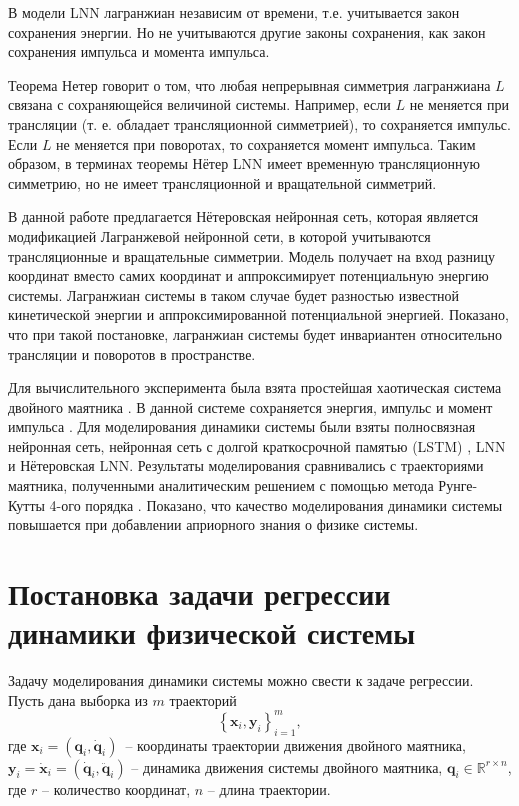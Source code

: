 \documentclass[12pt]{article}
\begin{document}
В модели LNN лагранжиан независим от времени, т.е. учитывается закон сохранения энергии. Но не учитываются другие законы сохранения, как закон сохранения импульса и момента импульса.

Теорема Нетер \cite{doi:10.1080/00411457108231446} говорит о том, что любая непрерывная симметрия лагранжиана $L$ связана с сохраняющейся величиной системы.  Например, если $L$ не меняется при трансляции (т. е. обладает трансляционной симметрией), то сохраняется импульс. Если $L$ не меняется при поворотах, то сохраняется момент импульса. Таким образом, в терминах теоремы Нётер LNN имеет временную трансляционную симметрию, но не имеет трансляционной и вращательной симметрий.

В данной работе предлагается Нётеровская нейронная сеть, которая является модификацией Лагранжевой нейронной сети, в которой учитываются трансляционные и вращательные симметрии. Модель получает на вход разницу координат вместо самих координат и аппроксимирует потенциальную энергию системы. Лагранжиан системы в таком случае будет разностью известной кинетической энергии и аппроксимированной потенциальной энергией. Показано, что при такой постановке, лагранжиан системы будет инвариантен относительно трансляции и поворотов в пространстве.

Для вычислительного эксперимента была взята простейшая хаотическая система двойного маятника \cite{arnold_mechanics}. В данной системе сохраняется энергия, импульс и момент импульса \cite{class_mechanics}. Для моделирования динамики системы были взяты полносвязная нейронная сеть\cite{SCHMIDHUBER201585}, нейронная сеть с долгой краткосрочной памятью (LSTM) \cite{lstm}, LNN \cite{Cranmer2020LagrangianNN} и Нётеровская LNN. Результаты моделирования сравнивались с траекториями маятника, полученными аналитическим решением с помощью метода Рунге-Кутты 4-ого порядка \cite{runge_kutta}. Показано, что качество моделирования динамики системы повышается при добавлении априорного знания о физике системы.


\section{Постановка задачи регрессии динамики физической системы}
Задачу моделирования динамики системы можно свести к задаче регрессии.
Пусть дана выборка из $m$ траекторий 
$$\left\{\mathbf{x}_i, \mathbf{y}_i\right\}_{i=1}^m,$$ где $\mathbf{x}_i = (\mathbf{q}_i, \mathbf{\dot{q}}_i)$~--  координаты траектории движения двойного маятника, $\mathbf{{y}}_i = \mathbf{\dot{x}}_i = (\mathbf{\dot{q}}_i, \mathbf{\ddot{q}}_i)$ -- динамика движения системы двойного маятника, $\mathbf{q}_i \in \mathbb{R}^{r \times n}$, где $r$ -- количество координат, $n$ -- длина траектории.
\end{document}
